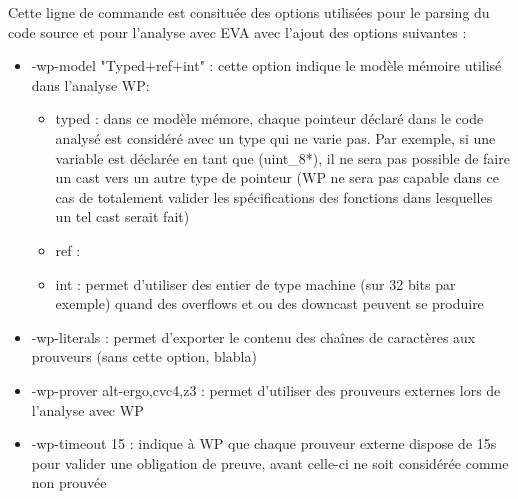 Cette ligne de commande est consituée des options utilisées pour le parsing du code source et pour l'analyse avec EVA avec l'ajout des options suivantes :
\begin{itemize}
	\item -wp-model "Typed+ref+int" : cette option indique le modèle mémoire utilisé dans l'analyse WP:
		\begin{itemize}
			\item typed : dans ce modèle mémore, chaque pointeur déclaré dans le code analysé est considéré avec un type qui ne varie pas. Par exemple, si une variable est déclarée en tant que (uint\_8*), il ne sera pas possible de faire un cast vers un autre type de pointeur (WP ne sera pas capable dans ce cas de totalement valider les spécifications des fonctions dans lesquelles un tel cast serait fait)
			\item ref : %
			\item int : permet d'utiliser des entier de type machine (sur 32 bits par exemple) quand des overflows et ou des downcast peuvent se produire
		\end{itemize}
	\item -wp-literals : permet d'exporter le contenu des chaînes de caractères aux prouveurs (sans cette option, blabla)
	\item -wp-prover alt-ergo,cvc4,z3 : permet d'utiliser des prouveurs externes lors de l'analyse avec WP
	\item -wp-timeout 15 : indique à WP que chaque prouveur externe dispose de 15s pour valider une obligation de preuve, avant celle-ci ne soit considérée comme non prouvée
\end{itemize}





